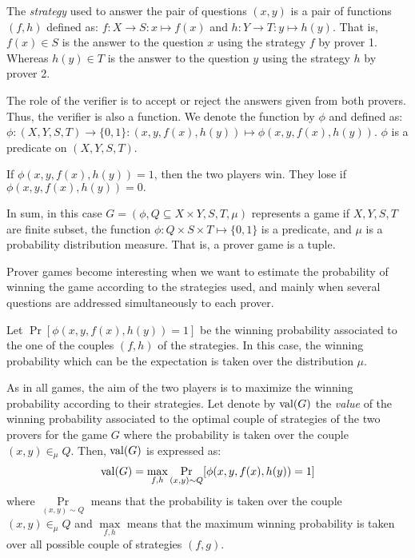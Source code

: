 The \textit{strategy} used to answer 
the pair of questions $(x,y)$
is a pair of functions $(f,h)$ defined as: $f: X \longrightarrow S: x \longmapsto f(x)$ and $h: Y \longrightarrow T: y \longmapsto h(y).$
That is, $f(x) \in S$ is the answer to the question $x$
using the strategy $f$ by prover 1. Whereas $h(y) \in T$ is the answer to the question $y$ using the strategy $h$ by prover 2.

The role of the verifier is to accept or reject the answers given from both provers. Thus, the verifier is also a function. We denote the function  
by $\phi$ and defined as: $\phi: (X,Y,S,T) \longrightarrow \{0,1\}: (x,y,f(x),h(y)) \longmapsto  \phi(x,y,f(x),h(y)).$ $\phi$ is a predicate on  $(X,Y,S,T).$

If $\phi(x,y,f(x),h(y))=1$, then the two players win. They lose if $\phi(x,y,f(x),h(y))=0.$ 

In sum, in this case $G=(\phi, Q\subseteq X \times Y, S,T, \mu)$ represents  a game if $X,Y,S,T$ are finite subset, the function $\phi: Q\times S \times T  \longmapsto \{0,1\}$ is a predicate, and $\mu$ is a probability distribution measure. That is, a prover game is a tuple.

Prover games become interesting when we want to estimate the probability of winning the game according to the strategies used, and mainly when several questions are addressed simultaneously  to each prover.

Let $\Pr[\phi(x,y,f(x),h(y))=1]$
be the winning probability associated to the one of the couples $(f,h)$ of the strategies. In this case, the winning probability \say{ $\Pr$} which can be the expectation is taken over the distribution $\mu.$

As in all games, the aim of the two players is to maximize the winning probability according to their strategies. Let denote by $\mathrm{val} (G)$ the \textit{value} of the winning probability associated to the optimal couple of strategies of the two provers for the game $G$ where the probability is taken over the couple $(x,y) \in_{\mu} Q$. Then, $\mathrm{val} (G)$ is expressed as: $$\mathrm{val} (G)=\max_{f,h}  \underset{(x,y) \sim Q}\Pr[\phi(x,y,f(x),h(y))=1]$$
where $\underset{(x,y) \sim Q}\Pr$ means that the probability is taken over the couple $(x,y) \in_{\mu} Q$ and $\max\limits_{f,h}$ means that the maximum winning probability  is taken over all possible couple of strategies $(f,g).$

